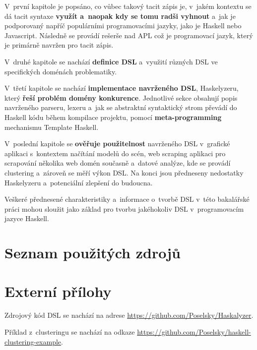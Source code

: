 \documentclass[male, czech]{kithesis}
\begin{document}
V~první kapitole je popsáno, 
co vůbec takový tacit zápis je,
v~jakém kontextu se dá tacit syntaxe \textbf{využít a~naopak kdy se tomu radši vyhnout}
a~jak je podporovaný napříč populárními programovacími jazyky,
jako je Haskell nebo Javascript. 
Následně se provádí rešerše nad APL což je programovací jazyk,
který je primárně navržen pro tacit zápis.

V~druhé kapitole se nachází \textbf{definice DSL}
a~využití různých DSL ve specifických doménách problematiky.

V~třetí kapitole se nachází \textbf{implementace navrženého DSL}, 
Haskelyzeru, 
který \textbf{řeší problém domény konkurence}.
Jednotlivé sekce obsahují popis navrženého parseru, 
lexeru
a~jak se abstraktní syntaktický strom převádí 
do Haskell kódu během kompilace projektu, 
pomocí \textbf{meta-programming} mechanismu Template Haskell.

V~poslední kapitole se \textbf{ověřuje použitelnost} navrženého DSL
v~grafické aplikaci s~kontextem načítání modelů do scén,
web scraping aplikaci pro scrapování několika web domén současně
a~datové analýze, 
kde se provádí clustering a~zároveň se měří výkon DSL.
Na konci jsou předneseny nedostatky Haskelyzeru
a~potenciální zlepšení do budoucna.

Veškeré přednesené charakteristiky
a~informace o~tvorbě DSL v~této bakalářské práci
mohou sloužit jako základ pro tvorbu jakéhokoliv DSL v~programovacím jazyce Haskell.

\chapter{Seznam použitých zdrojů}


\printbibliography[heading=none]
\appendix


\chapter{Externí přílohy}

Zdrojový kód DSL se nachází na adrese \href{https://github.com/Poselsky/Haskalyzer}{https://github.com/Poselsky/Haskalyzer}.

Příklad z~clusteringu se nachází na odkaze \href{https://github.com/Poselsky/haskell-clustering-example}{https://github.com/Poselsky/haskell-clustering-example}.
\end{document}
